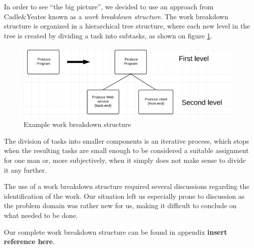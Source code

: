 In order to see “the big picture”, we decided to use an approach from Cadle\&Yeates\cite{caye} known as a \emph{work breakdown structure}. The work breakdown structure is organized in a hierarchical tree structure, where each new level in the tree is created by dividing a task into subtasks, as shown on figure \ref{fig:breakdown}.

\begin{figure}[hbtp]
	\includegraphics[scale=0.5]{./Empiri/Planning/img/wbslevels.png}
	\caption{Example work breakdown structure} \label{fig:breakdown}
\end{figure}

The division of tasks into smaller components is an iterative process, which stops when the resulting tasks are small enough to be considered a suitable assignment for one man or, more subjectively, when it simply does not make sense to divide it any further.

The use of a work breakdown structure required several discussions regarding the identification
of the work. Our situation left us especially prone to discussion as the problem domain was rather
new for us, making it difficult to conclude on what needed to be done.

Our complete work breakdown structure can be found in appendix \textbf{insert reference here}.